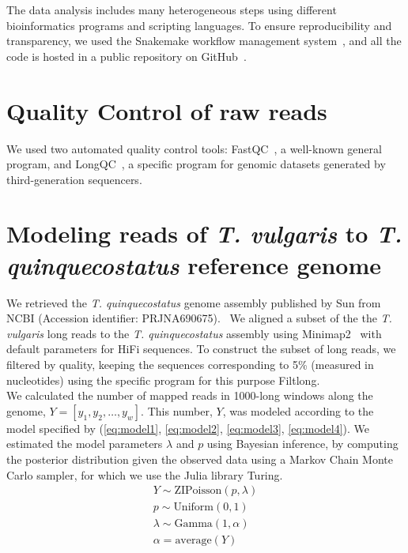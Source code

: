 The data analysis includes many heterogeneous steps using different bioinformatics programs and scripting languages. To ensure reproducibility and transparency, we used the Snakemake workflow management system~\cite{molderSustainableDataAnalysis2021}, and all the code is hosted in a public repository on GitHub~\cite{currocampuzanoCurrocamBiRCThymeVersion2023}.

\section{Quality Control of raw reads}

We used two automated quality control tools: FastQC~\cite{BabrahamBioinformaticsFastQC}, a well-known general program, and LongQC~\cite{fukasawaLongQCQualityControl2020}, a specific program for genomic datasets generated by third-generation sequencers. 

\section{Modeling reads of \textit{T. vulgaris} to \textit{T. quinquecostatus} reference genome}

We retrieved the \textit{T. quinquecostatus} genome assembly published by Sun \etal from NCBI (Accession identifier: PRJNA690675).~\cite{sunChromosomelevelAssemblyAnalysis2022} We aligned a subset of the the \textit{T. vulgaris} long reads to the \textit{T. quinquecostatus} assembly using Minimap2~\cite{liMinimap2PairwiseAlignment2018} with default parameters for HiFi sequences. To construct the subset of long reads, we filtered by quality, keeping the sequences corresponding to 5\% (measured in nucleotides) using the specific program for this purpose Filtlong.~\cite{wickRrwickFiltlong2023}\\



We calculated the number of mapped reads in 1000-long windows along the genome, $Y = [ y_1, y_2, \dots, y_w]$. This number, $Y$, was modeled according to the model specified by (\ref{eq:model1}, \ref{eq:model2}, \ref{eq:model3}, \ref{eq:model4}). We estimated the model parameters $\lambda$ and $p$ using Bayesian inference, by computing the posterior distribution given the observed data using a Markov Chain Monte Carlo sampler, for which we use the Julia library Turing.~\cite{DBLP:conf/aistats/GeXG18}\\

\begin{align}
Y \sim \textrm{ZIPoisson}(p, \lambda) \label{eq:model1}\\
p \sim \textrm{Uniform}(0, 1) \label{eq:model2}\\
\lambda \sim \textrm{Gamma}(1, \alpha)  \label{eq:model3}\\
\alpha = \textrm{average}(Y) \label{eq:model4}
\end{align}   

